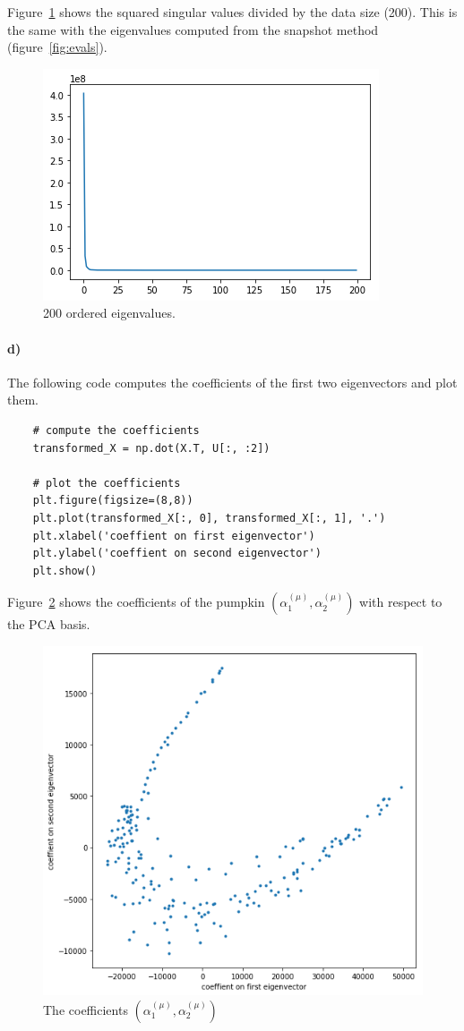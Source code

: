 \documentclass{article}
\begin{document}
	Figure~\ref{fig:eval_svd} shows the squared singular values divided by the data size (200). This is the same with the eigenvalues computed from the snapshot method (figure~\ref{fig:evals}).
	\begin{figure}[ht!]
	\centering
	\includegraphics[width=0.7\linewidth]{images/1_c_eval.png}
	\caption{200 ordered eigenvalues.}
	\label{fig:eval_svd}
	\end{figure}
	
	
	\paragraph{d)} The following code computes the coefficients of the first two eigenvectors and plot them. 
	\begin{lstlisting}
	# compute the coefficients
	transformed_X = np.dot(X.T, U[:, :2])
	
	# plot the coefficients
	plt.figure(figsize=(8,8))
	plt.plot(transformed_X[:, 0], transformed_X[:, 1], '.')
	plt.xlabel('coeffient on first eigenvector')
	plt.ylabel('coeffient on second eigenvector')
	plt.show()
	\end{lstlisting}
	
	Figure~\ref{fig:coefficients} shows the coefficients of the pumpkin $(\alpha^{(\mu)}_1, \alpha^{(\mu)}_2)$ with respect to the PCA basis. 	
	\begin{figure}[ht!]
	\centering
	\includegraphics[width=0.9\linewidth]{images/1_d.png}
	\caption{The coefficients $(\alpha^{(\mu)}_1, \alpha^{(\mu)}_2)$}
	\label{fig:coefficients}
	\end{figure}
	
\end{document}
